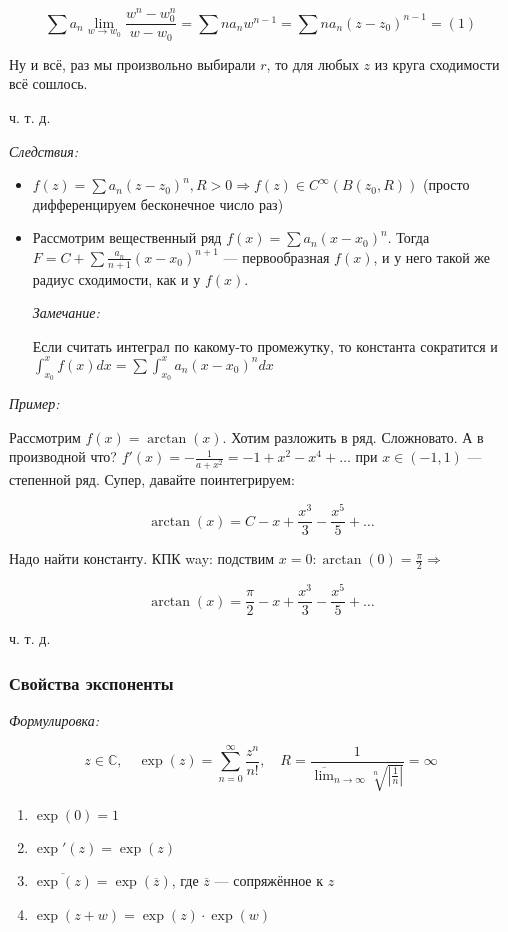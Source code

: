 \documentclass{article}
\begin{document}
\[\sum a_n \lim_{w \rightarrow w_0} \frac{w^n - w^n_0}{w - w_0} = \sum n a_n w^{n - 1} = \sum n a_n (z - z_0)^{n - 1} = (1)\]

Ну и всё, раз мы произвольно выбирали $r$, то для любых $z$ из круга сходимости всё сошлось.

ч. т. д.

\textit{Следствия:}

\begin{itemize}
    \item $f(z) = \sum a_n(z - z_0)^n, R > 0 \Rightarrow f(z) \in C^{\infty}(B(z_0, R))$ (просто дифференцируем бесконечное число раз)
    \item Рассмотрим вещественный ряд $f(x) = \sum a_n (x - x_0)^n$. Тогда  $F = C + \sum \frac{a_n}{n + 1}(x - x_0)^{n + 1}$ --- первообразная $f(x)$, и у него такой же радиус сходимости, как и у $f(x)$.
    
    \textit{Замечание:}

    Если считать интеграл по какому-то промежутку, то константа сократится и $\int_{x_0}^{x} f(x) dx = \sum \int_{x_0}^{x}a_n(x - x_0)^n dx$
\end{itemize}

\textit{Пример:}

Рассмотрим $f(x) = \arctan(x)$. Хотим разложить в ряд. Сложновато. А в производной что? $f'(x) = -\frac{1}{a + x^2} = -1 + x^2 - x^4 + \ldots$ при $x \in (-1, 1)$ --- степенной ряд. Супер, давайте поинтегрируем: 

\[\arctan(x) = C - x + \frac{x^3}{3} - \frac{x^5}{5} + \ldots\]

Надо найти константу. КПК way: подствим $x = 0: \arctan(0) = \frac{\pi}{2} \Rightarrow$

\[\arctan(x) = \frac{\pi}{2} - x + \frac{x^3}{3} - \frac{x^5}{5} + \ldots\]

ч. т. д.

\subsubsection{Свойства экспоненты}
\textit{Формулировка:}

\[z \in \mathbb{C}, \quad \exp(z) = \sum_{n = 0}^{\infty} \frac{z^n}{n!}, \quad R = \frac{1}{\overline{\lim}_{n \rightarrow \infty}\sqrt[n]{\left|\frac{1}{n}\right|}} = \infty\]

\begin{enumerate}
    \item $\exp(0) = 1$
    \item $\exp'(z) = \exp(z)$
    \item $\overline{\exp(z)} = \exp(\overline{z})$, где $\overline{z}$ --- сопряжённое к $z$
    \item $\exp(z + w) = \exp(z) \cdot \exp(w)$
\end{enumerate}
\end{document}
